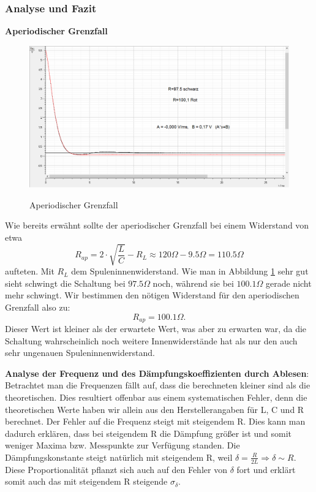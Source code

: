\documentclass[12pt,a4paper]{article}
\begin{document}
\subsubsection{Analyse und Fazit}
\textbf{Aperiodischer Grenzfall}
\begin{figure}[H]
\caption{Aperiodischer Grenzfall}
\centering
\includegraphics[scale=0.5]{Bilder/AperiodischerGrenzfall.png}
\label{Aperiodisch_Bild}
\end{figure}
Wie bereits erwähnt sollte der aperiodischer Grenzfall bei einem Widerstand von etwa
\begin{equation}
R_{ap}=2\cdot\sqrt{\frac{L}{C}}-R_{L}\approx 120\Omega - 9.5 \Omega=110.5\Omega
\end{equation}
aufteten. Mit $R_L$ dem Spuleninnenwiderstand.
Wie man in Abbildung \ref{Aperiodisch_Bild} sehr gut sieht schwingt die Schaltung bei $97.5\Omega$ noch, während sie bei $100.1\Omega$ gerade nicht mehr schwingt. Wir bestimmen den nötigen Widerstand für den aperiodischen Grenzfall also zu:
\begin{equation}
R_{ap}=100.1\Omega .
\end{equation}
Dieser Wert ist kleiner als der erwartete Wert, was aber zu erwarten war, da die Schaltung wahrscheinlich noch weitere Innenwiderstände hat als nur den auch sehr ungenauen Spuleninnenwiderstand.

\textbf{Analyse der Frequenz und des Dämpfungskoeffizienten durch Ablesen}: \newline
Betrachtet man die Frequenzen fällt auf, dass die berechneten kleiner sind als die theoretischen. Dies resultiert offenbar aus einem systematischen Fehler, denn die theoretischen Werte haben wir allein aus den Herstellerangaben für L, C und R berechnet. \newline
Der Fehler auf die Frequenz steigt mit steigendem R.
Dies kann man dadurch erklären, dass bei steigendem R die Dämpfung größer ist und somit weniger Maxima bzw. Messpunkte zur Verfügung standen.
\newline
Die Dämpfungskonstante steigt natürlich mit steigendem R, weil $\delta=\frac{R}{2L}\Rightarrow \delta \sim R$.
\newline
Diese Proportionalität pflanzt sich auch auf den Fehler von $\delta$ fort und erklärt somit auch das mit steigendem R steigende $\sigma_{\delta}$.
\end{document}
